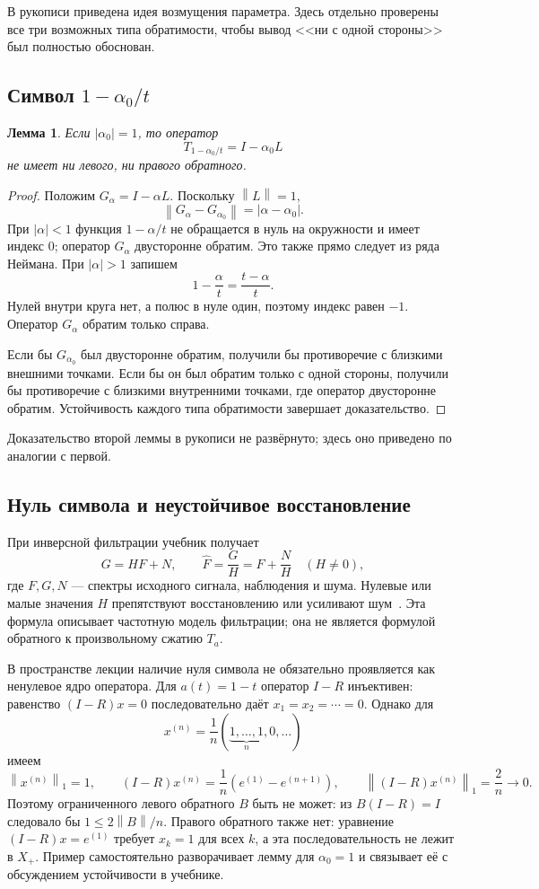 \documentclass[12pt,a4paper]{article}
\newtheorem{lemma}{Лемма}
\theoremstyle{definition}
\theoremstyle{remark}
\newcommand{\norm}[1]{\left\lVert #1\right\rVert}
\begin{document}
В рукописи приведена идея возмущения параметра. Здесь отдельно
проверены все три возможных типа обратимости, чтобы вывод
<<ни с одной стороны>> был полностью обоснован.

\subsection{Символ \texorpdfstring{$1-\alpha_0/t$}{1 - alpha0/t}}

\begin{lemma}
Если $|\alpha_0|=1$, то оператор
\[
  T_{1-\alpha_0/t}=I-\alpha_0 L
\]
не имеет ни левого, ни правого обратного.
\end{lemma}

\begin{proof}
Положим $G_\alpha=I-\alpha L$. Поскольку $\norm{L}=1$,
\[
  \norm{G_\alpha-G_{\alpha_0}}=|\alpha-\alpha_0|.
\]
При $|\alpha|<1$ функция $1-\alpha/t$ не обращается в нуль на
окружности и имеет индекс $0$; оператор $G_\alpha$ двусторонне обратим.
Это также прямо следует из ряда Неймана.
При $|\alpha|>1$ запишем
\[
  1-\frac\alpha t=\frac{t-\alpha}{t}.
\]
Нулей внутри круга нет, а полюс в нуле один, поэтому индекс равен $-1$.
Оператор $G_\alpha$ обратим только справа.

Если бы $G_{\alpha_0}$ был двусторонне обратим, получили бы противоречие
с близкими внешними точками. Если бы он был обратим только с одной
стороны, получили бы противоречие с близкими внутренними точками,
где оператор двусторонне обратим. Устойчивость каждого типа
обратимости завершает доказательство.
\end{proof}

Доказательство второй леммы в рукописи не развёрнуто;
здесь оно приведено по аналогии с первой.

\subsection*{Нуль символа и неустойчивое восстановление}

При инверсной фильтрации учебник получает
\[
  G=HF+N,\qquad \widehat F=\frac GH=F+\frac NH\quad(H\ne0),
\]
где $F,G,N$ --- спектры исходного сигнала, наблюдения и шума.
Нулевые или малые значения $H$ препятствуют восстановлению
или усиливают шум~\cite[\S\,5.7, с.~412]{GW2012}.
Эта формула описывает частотную модель фильтрации; она не является
формулой обратного к произвольному сжатию $T_a$.

В пространстве лекции наличие нуля символа не обязательно
проявляется как ненулевое ядро оператора. Для $a(t)=1-t$
оператор $I-R$ инъективен: равенство $(I-R)x=0$ последовательно
даёт $x_1=x_2=\cdots=0$. Однако для
\[
  x^{(n)}=\frac1n(\underbrace{1,\ldots,1}_{n},0,\ldots)
\]
имеем
\[
  \norm{x^{(n)}}_1=1,\qquad
  (I-R)x^{(n)}=\frac1n(e^{(1)}-e^{(n+1)}),\qquad
  \norm{(I-R)x^{(n)}}_1=\frac2n\longrightarrow0.
\]
Поэтому ограниченного левого обратного $B$ быть не может:
из $B(I-R)=I$ следовало бы $1\leqslant2\norm B/n$.
Правого обратного также нет: уравнение $(I-R)x=e^{(1)}$
требует $x_k=1$ для всех $k$, а эта последовательность не лежит в $X_+$.
Пример самостоятельно разворачивает лемму для $\alpha_0=1$
и связывает её с обсуждением устойчивости в учебнике.
\end{document}

